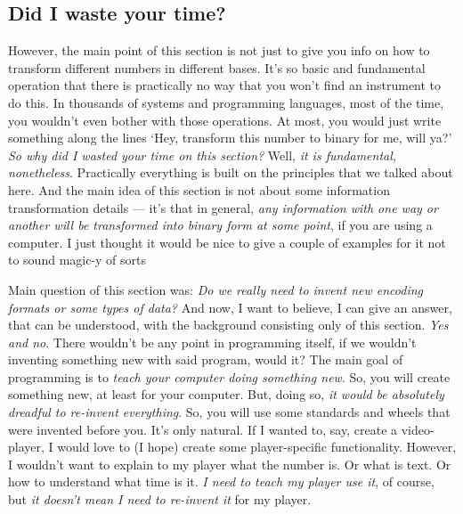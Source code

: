 \documentclass[../../what-is-computer.tex]{subfiles}
\begin{document}
    \subsection{Did I waste your time?}

    However, the main point of this section is not just to give you info on how to transform different numbers in different bases. It's so basic and fundamental
    operation that there is practically no way that you won't find an instrument to do this. In thousands of systems and programming languages, most of the time,
    you wouldn't even bother with those operations. At most, you would just write something along the lines `Hey, transform this number to binary for me, will ya?'
    \emph{So why did I wasted your time on this section?} Well, \emph{it is fundamental, nonetheless}. Practically everything is built on the principles that we 
    talked about here. And the main idea of this section is not about some information transformation details --- it's that in general, \emph{any information
    with one way or another will be transformed into binary form at some point}, if you are using a computer. I just thought it would be nice to give a couple of examples for
    it not to sound magic-y of sorts \par

    Main question of this section was: \emph{Do we really need to invent new encoding formats or some types of data?} And now, I want to believe, I can give an answer, that
    can be understood, with the background consisting only of this section. \emph{Yes and no}. There wouldn't be any point in programming itself, if we wouldn't 
    inventing something new with said program, would it? The main goal of programming is to \emph{teach your computer doing something new}. So, you will create 
    something new, at least for your computer. But, doing so, \emph{it would be absolutely dreadful to re-invent everything}. So, you will use some standards and
    wheels that were invented before you. It's only natural. If I wanted to, say, create a video-player, I would love to (I hope) create some player-specific functionality.
    However, I wouldn't want to explain to my player what the number is. Or what is text. Or how to understand what time is it. \emph{I need to teach my player use it}, of course,
    but \emph{it doesn't mean I need to re-invent it} for my player. \par
\end{document}
